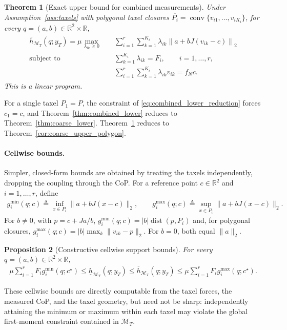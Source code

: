 \documentclass[11pt,a4paper]{article}
\theoremstyle{plain}
\newtheorem{theorem}{Theorem}[section]
\newtheorem{proposition}[theorem]{Proposition}
\newcommand{\R}{\mathbb{R}}
\begin{document}
\begin{theorem}[Exact upper bound for combined measurements]
\label{thm:combined_upper}
    Under Assumption~\ref{ass:taxels} with polygonal taxel closures $\overline{P_i}=\operatorname{conv}\{v_{i1},\ldots,v_{iK_i}\}$, for every $q=(a,b)\in\mathbb R^2\times\mathbb R$,
    \begin{align}
        \label{eq:combined_upper_reduction}
        \boxed{
        \begin{aligned}
        \overline h_{\mathcal M_T}(q;y_T)
        =
        \mu\max_{\lambda_{ik}\geq0}\quad&
        \sum_{i=1}^r\sum_{k=1}^{K_i}
        \lambda_{ik}
        \left\|a+bJ(v_{ik}-c)\right\|_2\\
        \text{subject to}\quad&
        \sum_{k=1}^{K_i}\lambda_{ik}=F_i,
        \qquad i=1,\ldots,r,\\
        &
        \sum_{i=1}^r\sum_{k=1}^{K_i}
        \lambda_{ik}v_{ik}=f_Nc.
        \end{aligned}}
    \end{align}
    This is a linear program. 
\end{theorem}

For a single taxel $P_1=P$, the constraint of \eqref{eq:combined_lower_reduction} forces $c_1=c$, and Theorem~\ref{thm:combined_lower} reduces to Theorem~\ref{thm:coarse_lower}.
Theorem~\ref{thm:combined_upper} reduces to Theorem~\ref{cor:coarse_upper_polygon}.

\paragraph{Cellwise bounds.}
Simpler, closed-form bounds are obtained by treating the taxels independently, dropping the coupling through the CoP.
For a reference point $c\in\R^2$ and $i=1,\ldots,r$, define
\begin{align}
g_i^{\min}(q;c)
\triangleq
\inf_{x\in P_i}
\|a+bJ(x-c)\|_2,
\qquad
g_i^{\max}(q;c)
\triangleq
\sup_{x\in P_i}
\|a+bJ(x-c)\|_2.
\end{align}
For $b\neq0$, with $p=c+Ja/b$, $g_i^{\min}(q;c)=|b|\operatorname{dist}(p,P_i)$ and, for polygonal closures, $g_i^{\max}(q;c)=|b|\max_k\|v_{ik}-p\|_2$. For $b=0$, both equal $\|a\|_2$.

\begin{proposition}[Constructive cellwise support bounds]
\label{prop:cellwise}
For every $q=(a,b)\in\mathbb R^2\times\mathbb R$,
\begin{align}
\label{eq:cellwise_MT}
\boxed{
\mu\sum_{i=1}^r F_i g_i^{\min}(q;c^\star)
\le
\underline h_{\mathcal M_T}(q;y_T)
\le
\overline h_{\mathcal M_T}(q;y_T)
\le
\mu\sum_{i=1}^r F_i g_i^{\max}(q;c^\star).
}
\end{align}
\end{proposition}
These cellwise bounds are directly computable from the taxel forces, the
measured CoP, and the taxel geometry, but need not be sharp: independently attaining the minimum or maximum within each taxel may violate
the global first-moment constraint contained in $\mathcal M_T$.
\end{document}
